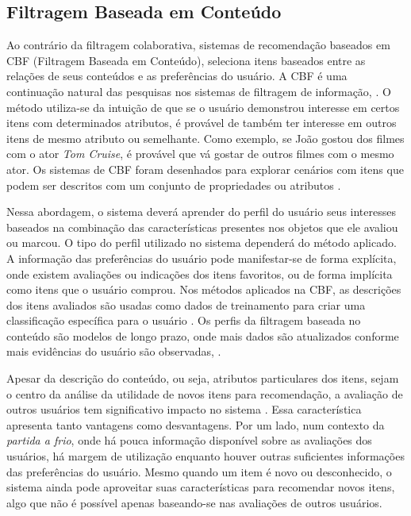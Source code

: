 \subsection{Filtragem Baseada em Conteúdo}

Ao contrário da filtragem colaborativa, sistemas de recomendação baseados em CBF (Filtragem Baseada em Conteúdo), seleciona itens baseados entre as relações de seus conteúdos e as preferências do usuário. A CBF é uma continuação natural das pesquisas nos sistemas de filtragem de informação, \cite{Burke:2002:HRS:586321.586352}.  O método utiliza-se da intuição de que se o usuário demonstrou interesse em certos itens com determinados atributos, é provável de também ter interesse em outros itens de mesmo atributo ou semelhante. Como exemplo, se João gostou dos filmes com o ator \textit{Tom Cruise}, é provável que vá gostar de outros filmes com o mesmo ator. Os sistemas de CBF foram desenhados para explorar cenários com itens que podem ser descritos com um conjunto de propriedades ou atributos \citep{Aggarwal2016}.

Nessa abordagem, o sistema deverá aprender do perfil do usuário seus interesses baseados na combinação das características presentes nos objetos que ele avaliou ou marcou.  O tipo do perfil utilizado no sistema dependerá do método aplicado. A informação das preferências do usuário pode manifestar-se de forma explícita, onde existem avaliações ou indicações dos itens favoritos, ou de forma implícita como itens que o usuário comprou. Nos métodos aplicados na CBF, as descrições dos itens avaliados são usadas como dados de treinamento para criar uma classificação específica para o usuário \citep{Aggarwal2016}. Os perfis da filtragem baseada no conteúdo são modelos de longo prazo, onde mais dados são atualizados conforme mais evidências do usuário são observadas, \cite{Burke:2002:HRS:586321.586352}.

Apesar da descrição do conteúdo, ou seja, atributos particulares dos itens, sejam o centro da análise da utilidade de novos itens para recomendação, a avaliação de outros usuários tem significativo impacto no sistema \citep{Aggarwal2016}. Essa característica apresenta tanto vantagens como desvantagens. Por um lado, num contexto da \textit{partida a frio}, onde há pouca informação disponível sobre as avaliações dos usuários, há margem de utilização enquanto houver outras suficientes informações das preferências do usuário. Mesmo quando um item é novo ou desconhecido, o sistema ainda pode aproveitar suas características para recomendar novos itens, algo que não é possível apenas baseando-se nas avaliações de outros usuários. 

